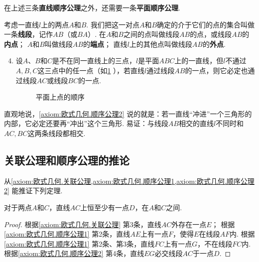 在上述三条\textbf{直线顺序公理}之外，还需要一条\textbf{平面顺序公理}.

\begin{axiom}[顺序公理II]\label{axiom:欧式几何.顺序公理2}
考虑一直线\(l\)上的两点\(A\)和\(B\).
我们把这一对点\(A\)和\(B\)确定的介于它们的点的集合叫做一条\textbf{线段}，记作\(AB\)（或\(BA\)）.
在\(A\)和\(B\)之间的点叫做线段\(AB\)的点，或线段\(AB\)的\textbf{内点}；
\(A\)和\(B\)叫做线段\(AB\)的\textbf{端点}；
直线\(l\)上的其他点叫做线段\(AB\)的\textbf{外点}.
\begin{enumerate}
\setcounter{enumi}{3}
\item 设\(A\)、\(B\)和\(C\)是不在同一直线上的三点，\(l\)是平面\(ABC\)上的一直线，但\(l\)不通过\(A,B,C\)这三点中的任一点（如\cref{figure:欧式几何.平面上点的顺序1} ），若直线\(l\)通过线段\(AB\)的一点，则它必定也通过线段\(AC\)或线段\(BC\)的一点.
\begin{figure}[ht]
\centering
{}
\caption{平面上点的顺序}
\label{figure:欧式几何.平面上点的顺序1}
\end{figure}
\end{enumerate}
\end{axiom}
直观地说，\cref{axiom:欧式几何.顺序公理2} 说的就是：若一直线“冲进”一个三角形的内部，它必定还要再“冲出”这个三角形.
易证：与线段\(AB\)相交的直线\(l\)不同时和\(AC,BC\)这两条线段都相交.

\subsection{关联公理和顺序公理的推论}
从\cref{axiom:欧式几何.关联公理,axiom:欧式几何.顺序公理1,axiom:欧式几何.顺序公理2} 能推证下列定理.
\begin{theorem}\label{theorem:欧式几何.定理3}
对于两点\(A\)和\(C\)，直线\(AC\)上恒至少有一点\(D\)，在\(A\)和\(C\)之间.
\begin{proof}
根据\cref{axiom:欧式几何.关联公理} 第3条，直线\(AC\)外存在一点\(E\)；
根据\cref{axiom:欧式几何.顺序公理1} 第2条，直线\(AE\)上有一点\(F\)，使得\(E\)在线段\(AF\)内.
根据\cref{axiom:欧式几何.顺序公理1} 第2条、第3条，直线\(FC\)上有一点\(G\)，不在线段\(FC\)内.
根据\cref{axiom:欧式几何.顺序公理2} 第4条，直线\(EG\)必交线段\(AC\)于一点\(D\).
\end{proof}
\end{theorem}


